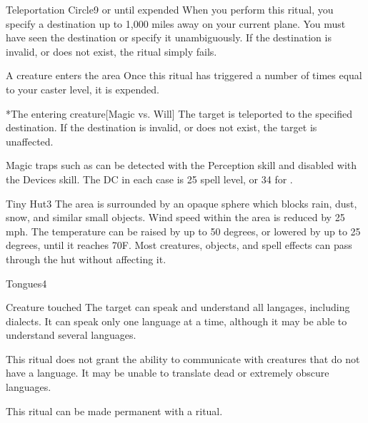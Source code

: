 \begin{spellsection}{Teleportation Circle}{9}
\spelldur \durext or until expended \dismissable
\spellspecial When you perform this ritual, you specify a destination up to 1,000 miles away on your current plane. You must have seen the destination or specify it unambiguously. If the destination is invalid, or does not exist, the ritual simply fails.
\begin{spelltrigger}{A creature enters the area}
    \spellspecial Once this ritual has triggered a number of times equal to your caster level, it is expended.
    \begin{spelltarget}*{The entering creature}[Magic vs. Will]
        \spelleffect The target is teleported to the specified destination. If the destination is invalid, or does not exist, the target is unaffected.
    \end{spelltarget}
\end{spelltrigger}

\spellnotes Magic traps such as  can be detected with the Perception skill and disabled with the Devices skill. The DC in each case is 25 \add spell level, or 34 for .
\end{spellsection}

\begin{spellsection}{Tiny Hut}{3}
\spelldur \durext \dismissable
{}
\spellline
\spelleffect The area is surrounded by an opaque sphere which blocks rain, dust, snow, and similar small objects. Wind speed within the area is reduced by 25 mph. The temperature can be raised by up to 50 degrees, or lowered by up to 25 degrees, until it reaches 70\degree F.
\spellnotes Most creatures, objects, and spell effects can pass through the hut without affecting it.
\end{spellsection}

\begin{spellsection}{Tongues}{4}
\spelldur \durlong
\begin{spelltarget}{Creature touched}
    \spelleffect The target can speak and understand all langages, including dialects. It can speak only one language at a time, although it may be able to understand several languages.
\end{spelltarget}
\spellnotes This ritual does not grant the ability to communicate with creatures that do not have a language. It may be unable to translate dead or extremely obscure languages. 

This ritual can be made permanent with a  ritual.
\end{spellsection}

